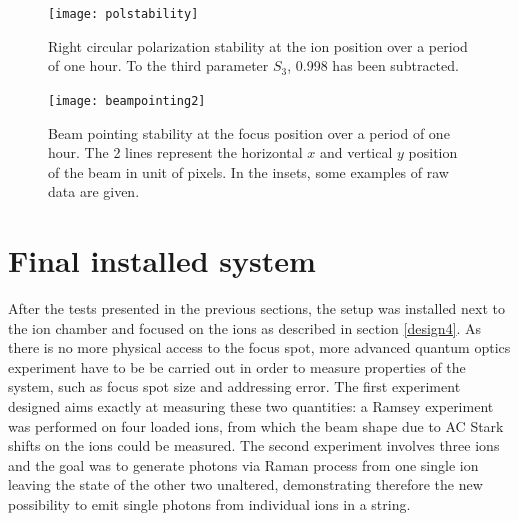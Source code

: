 \begin{figure}[H]
\centering
\texttt{[image: polstability]}
\caption{Right circular polarization stability at the ion position over a period of one hour. To the third parameter $S_3$, 0.998 has been subtracted.}
\label{polstability}
\end{figure}

\begin{figure}[H]
\centering
\texttt{[image: beampointing2]}
\caption{Beam pointing stability at the focus position over a period of one hour. The 2 lines represent the horizontal $x$ and vertical $y$ position of the beam in unit of pixels. In the insets, some examples of raw data are given.}
\label{beampointing}
\end{figure}


\newpage
\section{Final installed system}
\label{sec:finalsetup}
After the tests presented in the previous sections, the setup was installed next to the ion chamber and focused on the ions as described in section \ref{design4}. As there is no more physical access to the focus spot, more advanced quantum optics experiment have to be be carried out in order to measure properties of the system, such as focus spot size and addressing error. The first experiment designed aims exactly at measuring these two quantities: a Ramsey experiment was performed on four loaded ions, from which the beam shape due to AC Stark shifts on the ions could be measured.
The second experiment involves three ions and the goal was to generate photons via Raman process from one single ion leaving the state of the other two unaltered, demonstrating therefore the new possibility to emit single photons from individual ions in a string.

